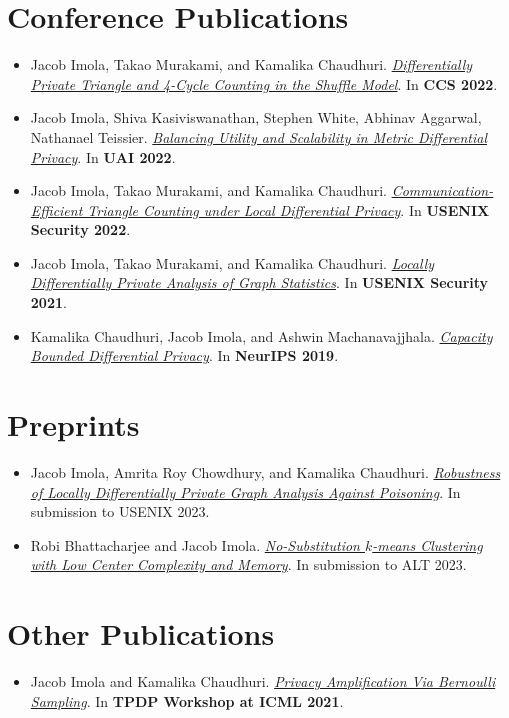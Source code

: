 \documentclass[11pt]{article}
\begin{document}
\section*{Conference Publications}
\begin{itemize}
	\setlength\itemsep{-0.3em}
	\item Jacob Imola, Takao Murakami, and Kamalika Chaudhuri.
		\textit{\href{https://arxiv.org/abs/2205.01429.pdf}{Differentially Private Triangle and 4-Cycle Counting in the Shuffle Model}}. In \textbf{CCS 2022}. 
	\item Jacob Imola, Shiva Kasiviswanathan, Stephen White, Abhinav Aggarwal, Nathanael Teissier.
		\textit{\href{https://openreview.net/pdf?id=B0l8-wLjql5}{Balancing Utility and Scalability in Metric Differential Privacy}}. In \textbf{UAI 2022}.
	\item 
		Jacob Imola, Takao Murakami, and Kamalika Chaudhuri.
		\textit{\href{https://arxiv.org/abs/2110.06485}{Communication-Efficient Triangle Counting under Local Differential Privacy}}. In \textbf{USENIX Security 2022}.
	\item 
		Jacob Imola, Takao Murakami, and Kamalika Chaudhuri.
		\textit{\href{https://arxiv.org/abs/2010.08688}{Locally Differentially Private Analysis of Graph Statistics}}. In \textbf{USENIX Security 2021}.
	\item
		Kamalika Chaudhuri, Jacob Imola, and Ashwin Machanavajjhala.
		\textit{\href{https://arxiv.org/abs/1907.02159}{Capacity Bounded Differential Privacy}}.
	  In \textbf{NeurIPS 2019}.
\end{itemize}

\section*{Preprints}
\begin{itemize}
	\setlength\itemsep{-0.3em}
	\item
		Jacob Imola, Amrita Roy Chowdhury, and Kamalika Chaudhuri.
		\textit{\href{https://arxiv.org/pdf/2210.14376.pdf}{Robustness of Locally Differentially Private Graph Analysis Against Poisoning}}. In submission to USENIX 2023.
	\item 
		Robi Bhattacharjee and Jacob Imola.
		\textit{\href{https://arxiv.org/abs/2102.09101}{No-Substitution $k$-means Clustering with Low Center Complexity and Memory}}. In submission to ALT 2023.
\end{itemize}

\section*{Other Publications}
\begin{itemize}
	\setlength\itemsep{-0.3em}
	\item
		Jacob Imola and Kamalika Chaudhuri.
		\textit{\href{https://arxiv.org/abs/2105.10594}{Privacy Amplification Via Bernoulli Sampling}}. In \textbf{TPDP Workshop at ICML 2021}.
\end{itemize}
\end{document}
